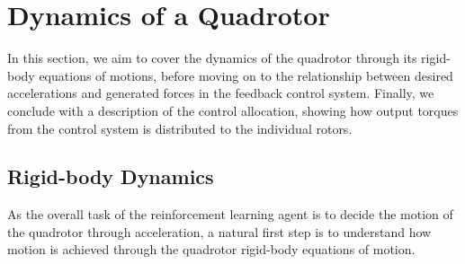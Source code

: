 \section{Dynamics of a Quadrotor}
\label{sec:4_dynamics}
In this section, we aim to cover the dynamics of the quadrotor through its rigid-body equations of motions, before moving on to the relationship between desired accelerations and generated forces in the feedback control system. Finally, we conclude with a description of the control allocation, showing how output torques from the control system is distributed to the individual rotors.

\subsection{Rigid-body Dynamics}
\label{sec:4_2_dynamics}
As the overall task of the reinforcement learning agent is to decide the motion of the quadrotor through acceleration, a natural first step is to understand how motion is achieved through the quadrotor rigid-body equations of motion.

